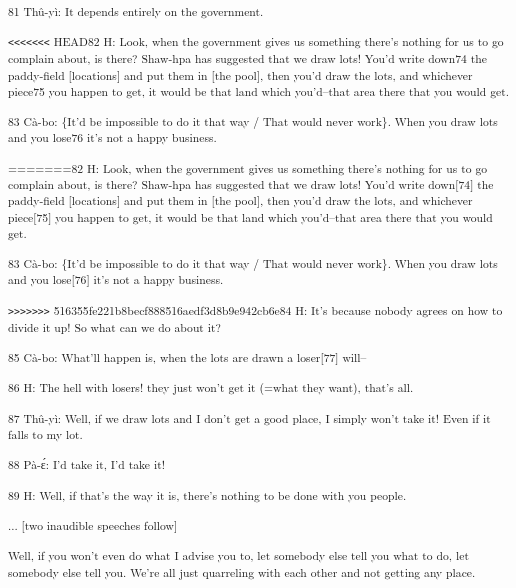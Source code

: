 {\textsuperscript{81 Thû-yì: It depends entirely on the government.}}

{\textsuperscript{\texttt{<}\texttt{<}\texttt{<}\texttt{<}\texttt{<}\texttt{<}\texttt{<}
HEAD82 H: Look, when the government gives us something there's nothing for us to
go complain about, is there? Shaw-hpa has suggested that we draw lots! You'd write
down74 the paddy-field [locations] and put them in [the pool], then you'd draw
the lots, and whichever piece75 you happen to get, it would be that land which
you'd--that area there that you would get. }}

{\textsuperscript{83 Cà-bo: \{It'd be impossible to do it that way / That
would never work\}. When you draw lots and you lose76 it's not a happy business.
}}

{\textsuperscript{=======82 H: Look, when the government gives us something
there's nothing for us to go complain about, is there? Shaw-hpa has suggested that
we draw lots! You'd write down[74] the paddy-field [locations] and put them in
[the pool], then you'd draw the lots, and whichever piece[75] you happen to get,
it would be that land which you'd--that area there that you would get. }}

{\textsuperscript{83 Cà-bo: \{It'd be impossible to do it that way / That
would never work\}. When you draw lots and you lose[76] it's not a happy business.
}}

{\textsuperscript{\texttt{>}\texttt{>}\texttt{>}\texttt{>}\texttt{>}\texttt{>}\texttt{>}
516355fe221b8becf888516aedf3d8b9e942cb6e84 H: It's because nobody agrees on how
to divide it up! So what can we do about it? }}

{\textsuperscript{85 Cà-bo: What'll happen is, when the lots are drawn
a loser[77] will--}}

{\textsuperscript{86 H: The hell with losers! they just won't get it (=what
they want), that's all. }}

{\textsuperscript{87 Thû-yì: Well, if we draw lots and I don't get a good
place, I simply won't take it! Even if it falls to my lot. }}

{\textsuperscript{88 Pà-ɛ́: I'd take it, I'd take it! }}

{\textsuperscript{89 H: Well, if that's the way it is, there's nothing to
be done with you people. }}

{\textsuperscript{... [two inaudible speeches follow]}}

{\textsuperscript{Well, if you won't even do what I advise you to, let somebody
else tell you what to do, let somebody else tell you. We're all just quarreling
with each other and not getting any place. }}

